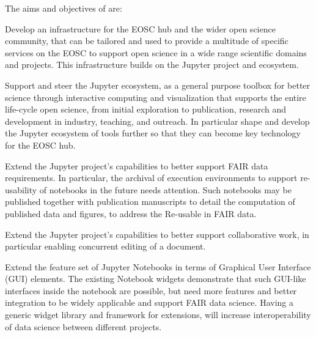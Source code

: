 

\noindent The aims and objectives of \TheProject are:
\begin{compactenum}
\item Develop an infrastructure for the EOSC hub and the wider open
  science community, that can be tailored and used to provide a
  multitude of specific services on the EOSC to support open science
  in a wide range scientific domains and projects. This infrastructure
  builds on the Jupyter project and ecosystem.

\item \label{aim:jupyter}
  Support and steer the Jupyter ecosystem, as a general purpose
  toolbox for better science through interactive computing and
  visualization that supports the entire life-cycle open science, from
  initial exploration to publication, research and development in
  industry, teaching, and outreach. In particular shape and develop
  the Jupyter ecosystem of tools further so that they can become key
  technology for the EOSC hub.

\item \label{aim:jupyter-reusability}%
  Extend the Jupyter project's capabilities to better support FAIR
  data requirements. In particular, the archival of execution
  environments to support re-usability of notebooks in the future
  needs attention. Such notebooks may be published together with
  publication manuscripts to detail the computation of published data
  and figures, to address the Re-usable in FAIR data.

\item \label{aim:jupyter-collaboration}%
  Extend the Jupyter project's capabilities to better support
  collaborative work, in particular enabling concurrent editing of a
  document.

\item \label{aim:jupyter-widgets}%
  Extend the feature set of Jupyter Notebooks in terms of Graphical
  User Interface (GUI) elements. The existing Notebook widgets
  demonstrate that such GUI-like interfaces inside the notebook are
  possible, but need more features and better integration to be widely
  applicable and support FAIR data science. Having a generic widget
  library and framework for extensions, will increase interoperability
  of data science between different projects.


\end{compactenum}
